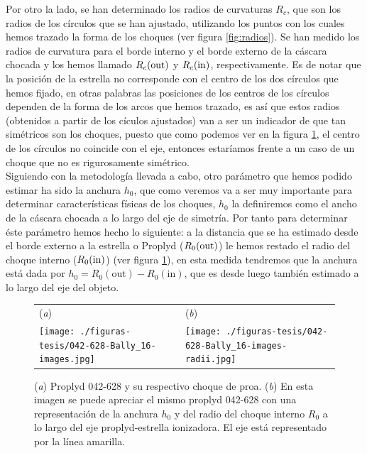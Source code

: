 Por otro la lado, se han determinado los radios de curvaturas \(R_{c}\), que son los radios de los círculos que se han ajustado, utilizando los puntos con los cuales hemos trazado la forma de los choques (ver figura \ref{fig:radios}). Se han medido los radios de curvatura para el borde interno y el borde externo de la cáscara chocada y los hemos llamado \(R_{c}(\mathrm{out}{})\) y \(R_{c}(\mathrm{in}{})\), respectivamente. Es de notar que la posición de la estrella no corresponde con el centro de los dos círculos que hemos fijado, en otras palabras las posiciones de los centros de los círculos dependen de la forma de los arcos que hemos trazado, es así que estos radios (obtenidos a partir de los cículos ajustados) van a ser un indicador de que tan simétricos son los choques, puesto que como podemos ver en la figura \ref{fig:anchura}, el centro de los círculos no coincide con el eje, entonces estaríamos frente a un caso de un choque que no es rigurosamente simétrico.\\

Siguiendo con la metodología llevada a cabo, otro parámetro que hemos podido estimar ha sido la anchura \(h_{0}\), que como veremos va a ser muy importante para determinar características físicas de los choques, \(h_{0}\) la definiremos como el ancho de la cáscara chocada a lo largo del eje de simetría. Por tanto para determinar éste parámetro hemos hecho lo siguiente: a la distancia que se ha estimado desde el borde externo a la estrella o Proplyd (\(R_{0}(\mathrm{out}{})\)) le hemos restado el radio del choque interno (\(R_{0}(\mathrm{in}{})\)) (ver figura \ref{fig:anchura}), en esta medida tendremos que la anchura está dada por \(h_{0} = R_{0}(\text{out}) - R_{0}(\text{in})\), que es desde luego también estimado a lo largo del eje del objeto.

\begin{figure}[htp]
\centering
\begin{tabular}{l l}
(\textit{a}) & (\textit{b})  \\
  \texttt{[image: ./figuras-tesis/042-628-Bally\_16-images.jpg]}&
 \texttt{[image: ./figuras-tesis/042-628-Bally\_16-images-radii.jpg]}\\
\end{tabular}
\caption{(\textit{a}) Proplyd 042-628 y su respectivo choque de proa. (\textit{b}) En esta imagen se puede apreciar el mismo proplyd 042-628  con una representación de la anchura \(h_{0}\) y del radio del choque interno \(R_{0}\) a lo largo del eje proplyd-estrella ionizadora. El eje está representado por la línea amarilla.}\label{fig:anchura}
\end{figure}


